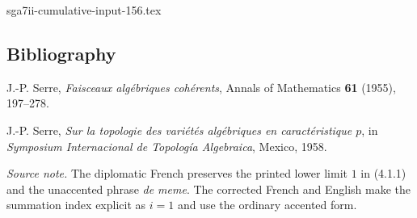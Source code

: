 \begin{filecontents*}{sga7ii-cumulative-input-156.tex}
\subsection*{Bibliography}

\begin{enumerate}[label={\textup{[\arabic*]}},leftmargin=2.6em]
\item J.-P. Serre, \emph{Faisceaux algébriques cohérents}, Annals of
  Mathematics \textbf{61} (1955), 197--278.
\item J.-P. Serre, \emph{Sur la topologie des variétés algébriques en
  caractéristique $p$}, in \emph{Symposium Internacional de Topología
  Algebraica}, Mexico, 1958.
\end{enumerate}

\medskip
\noindent\emph{Source note.}
The diplomatic French preserves the printed lower limit $1$ in (4.1.1) and
the unaccented phrase \emph{de meme}.  The corrected French and English make
the summation index explicit as $i=1$ and use the ordinary accented form.
\end{filecontents*}
